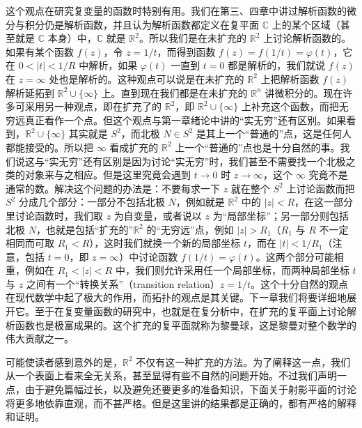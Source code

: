 这个观点在研究复变量的函数时特别有用。我们在第三、四章中讲过解析函数的微分与积分仍是解析函数，并且认为解析函数都定义在复平面 $\mathbb C$ 上的某个区域（甚至就是 $\mathbb C$ 本身）中，$\mathbb C$ 就是 $\mathbb R^2$。所以我们是在未扩充的 $\mathbb R^2$ 上讨论解析函数的。如果有某个函数 $f(z)$，令 $z=1/t$，而得到函数 $f(z)=f(1/t)=\varphi(t)$，它在 $0<|t|<1/R$ 中解析，如果 $\varphi(t)$ 一直到 $t=0$ 都是解析的，我们就说 $f(z)$ 在 $z=\infty$ 处也是解析的。这种观点可以说是在未扩充的 $\mathbb R^2$ 上把解析函数 $f(z)$ 解析延拓到 $\mathbb R^2\cup\{\infty\}$ 上。直到现在我们都是在未扩充的 $\mathbb R^n$ 讲微积分的。现在许多可采用另一种观点，即在扩充了的 $\mathbb R^2$，即 $\mathbb R^2\cup\{\infty\}$ 上补充这个函数，而把无穷远真正看作一个点。但这个观点与第一章绪论中讲的“实无穷”还有区别。如果看到，$\mathbb R^2\cup\{\infty\}$ 其实就是 $S^2$，而北极 $N\in S^2$ 是其上一个“普通的”点，这是任何人都能接受的。所以把 $\infty$ 看成扩充的 $\mathbb R^2$ 上一个“普通的”点也是十分自然的事。我们说这与“实无穷”还有区别是因为讨论“实无穷”时，我们甚至不需要找一个北极之类的对象来与之相应。但是这里究竟会遇到 $t\to0$ 时 $z\to\infty$，这个 $\infty$ 究竟不是通常的数。解决这个问题的办法是：不要每求一下 $z$ 就在整个 $S^2$ 上讨论函数而把 $S^2$ 分成几个部分：一部分不包括北极 $N$，例如就是 $\mathbb R^2$ 中的 $|z|<R$，在这一部分里讨论函数时，我们取 $z$ 为自变量，或者说以 $z$ 为“局部坐标”；另一部分则包括北极 $N$，也就是包括“扩充的”$\mathbb R^2$ 的“无穷远”点，例如 $|z|>R_1$（$R_1$ 与 $R$ 不一定相同而可取 $R_1<R$），这时我们就换一个新的局部坐标 $t$，而在 $|t|<1/R_1$（注意，包括 $t=0$，即 $z=\infty$）中讨论函数 $f(1/t)=\varphi(t)$。这两个部分可能相重，例如在 $R_1<|z|<R$ 中，我们则允许采用任一个局部坐标，而两种局部坐标 $t$ 与 $z$ 之间有一个“转换关系”（transition relation）$z=1/t$。这个十分自然的观点在现代数学中起了极大的作用，而拓扑的观点是其关键。下一章我们将要详细地展开它。至于在复变量函数的研究中，也就是在复分析中，在扩充的复平面上讨论解析函数也是极富成果的。这个扩充的复平面就称为黎曼球，这是黎曼对整个数学的伟大贡献之一。

可能使读者感到意外的是，$\mathbb R^2$ 不仅有这一种扩充的方法。为了阐释这一点，我们从一个表面上看来全无关系，甚至显得有些不自然的问题开始。不过我们声明一点，由于避免篇幅过长，以及避免还要更多的准备知识，下面关于射影平面的讨论将更多地依靠直观，而不甚严格。但是这里讲的结果都是正确的，都有严格的解释和证明。

